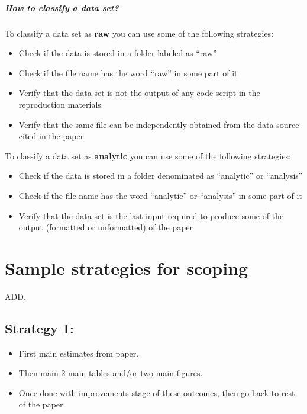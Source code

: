 \documentclass[]{book}
\providecommand{\tightlist}{%
  \setlength{\itemsep}{0pt}\setlength{\parskip}{0pt}}
\let\oldsubparagraph\subparagraph
\renewcommand{\subparagraph}[1]{\oldsubparagraph{#1}\mbox{}}
\begin{document}
\hypertarget{how-to-classify-a-data-set}{%
\subparagraph{How to classify a data set?}\label{how-to-classify-a-data-set}}

To classify a data set as \textbf{raw} you can use some of the following strategies:

\begin{itemize}
\tightlist
\item
  Check if the data is stored in a folder labeled as ``raw''\\
\item
  Check if the file name has the word ``raw'' in some part of it\\
\item
  Verify that the data set is not the output of any code script in the reproduction materials\\
\item
  Verify that the same file can be independently obtained from the data source cited in the paper
\end{itemize}

To classify a data set as \textbf{analytic} you can use some of the following strategies:

\begin{itemize}
\tightlist
\item
  Check if the data is stored in a folder denominated as ``analytic'' or ``analysis''\\
\item
  Check if the file name has the word ``analytic'' or ``analysis'' in some part of it\\
\item
  Verify that the data set is the last input required to produce some of the output (formatted or unformatted) of the paper
\end{itemize}

\hypertarget{sample-strategies-for-scoping}{%
\section{Sample strategies for scoping}\label{sample-strategies-for-scoping}}

ADD.

\hypertarget{strategy-1}{%
\subsection{Strategy 1:}\label{strategy-1}}

\begin{itemize}
\item
  First main estimates from paper.
\item
  Then main 2 main tables and/or two main figures.
\item
  Once done with improvements stage of these outcomes, then go back to rest of the paper.
\end{itemize}
\end{document}
